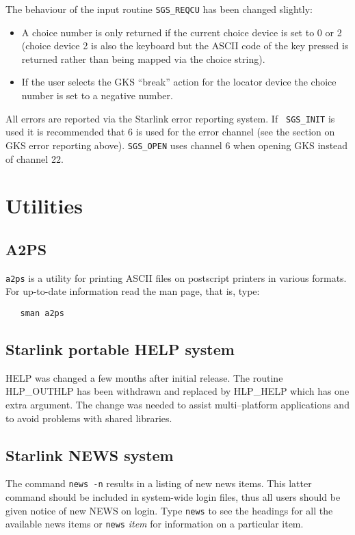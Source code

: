 The behaviour of the input routine {\tt SGS\_REQCU} has been changed slightly:
\begin{itemize}
\item A choice number is only returned if the current choice device is set to 0
or 2 (choice device 2 is also the keyboard but the ASCII code of the key
pressed is returned rather than being mapped via the choice string).
\item If the user selects the GKS ``break'' action for the locator device
the choice number is set to a negative number.
\end{itemize}

All errors are reported via the Starlink error reporting system. If {\tt
SGS\_INIT} is used it is recommended that 6 is used for the error channel (see
the section on GKS error reporting above). {\tt SGS\_OPEN} uses channel 6 when
opening GKS instead of channel 22.


\section{Utilities}


\subsection{A2PS}

{\tt a2ps} is a utility for printing ASCII files on postscript printers in
various formats.
For up-to-date information read the man page, that is, type:
\begin{verbatim}
   sman a2ps
\end{verbatim}

\subsection{Starlink portable HELP system}


HELP was changed a few months after initial release. The routine
HLP\_OUTHLP has been withdrawn and replaced by HLP\_HELP which has
one extra argument. The change was needed to assist multi--platform 
applications and to avoid problems with shared libraries.

\subsection{Starlink NEWS system}

The command {\tt news -n} results in a listing of new news items.
This latter command  should be included in system-wide login 
files, thus all users should be given notice of new 
NEWS on login.
Type {\tt news} to see the headings for all the available news items
or {\tt news} {\sl item} for information on a particular item.

